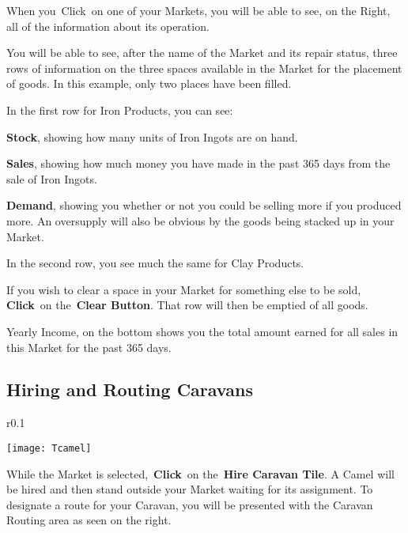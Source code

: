 When you Click on one of your Markets, you will be able to see, on the Right, all of the information about its operation.

You will be able to see, after the name of the Market and its repair status, three rows of information on the three spaces available in the Market for the placement of goods. In this example, only two places have been filled.

In the first row for Iron Products, you can see:


\textbf{Stock}, showing how many units of Iron Ingots are on hand.

\textbf{Sales}, showing how much money you have made in the past 365 days from the sale of Iron Ingots.

\textbf{Demand}, showing you whether or not you could be selling more if you produced more. An oversupply will also be obvious by the goods being stacked up in your Market.

In the second row, you see much the same for Clay Products.

If you wish to clear a space in your Market for something else to be sold, \textbf{Click} on the \textbf{Clear Button}. That row will then be emptied of all goods.


Yearly Income, on the bottom shows you the total amount earned for all sales in this Market for the past 365 days.

\subsection{Hiring and Routing Caravans}

\begin{wrapfigure}{r}{0.1\textwidth}
	\vspace{-20pt}
	\begin{center}
		\texttt{[image: Tcamel]}
	\end{center}
	\vspace{-20pt}
\end{wrapfigure}


While the Market is selected, \textbf{Click} on the \textbf{Hire Caravan Tile}. A Camel will be hired and then stand outside your Market waiting for its assignment. To designate a route for your Caravan, you will be presented with the Caravan Routing area as seen on the right.

